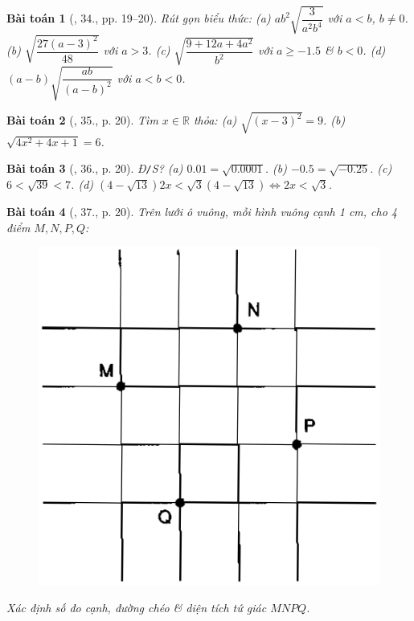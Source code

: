\documentclass{article}
\newtheorem{baitoan}{Bài toán}
\begin{document}
\begin{baitoan}[\cite{SGK_Toan_9_tap_1}, 34., pp. 19--20]
	Rút gọn biểu thức: (a) $ab^2\sqrt{\dfrac{3}{a^2b^4}}$ với $a < b$, $b\ne0$. (b) $\sqrt{\dfrac{27(a - 3)^2}{48}}$ với $a > 3$. (c) $\sqrt{\dfrac{9 + 12a + 4a^2}{b^2}}$ với $a\ge-1.5$ \& $b < 0$. (d) $(a - b)\sqrt{\dfrac{ab}{(a - b)^2}}$ với $a < b < 0$.
\end{baitoan}

\begin{baitoan}[\cite{SGK_Toan_9_tap_1}, 35., p. 20]
	Tìm $x\in\mathbb{R}$ thỏa: (a) $\sqrt{(x - 3)^2} = 9$. (b) $\sqrt{4x^2 + 4x + 1} = 6$.
\end{baitoan}

\begin{baitoan}[\cite{SGK_Toan_9_tap_1}, 36., p. 20]
	\emph{Đ\texttt{/}S?} (a) $0.01 = \sqrt{0.0001}$. (b) $-0.5 = \sqrt{-0.25}$. (c) $6 < \sqrt{39} < 7$. (d) $(4 - \sqrt{13})2x < \sqrt{3}(4 - \sqrt{13})\Leftrightarrow2x < \sqrt{3}$.
\end{baitoan}

\begin{baitoan}[\cite{SGK_Toan_9_tap_1}, 37., p. 20]
	Trên lưới ô vuông, mỗi hình vuông cạnh \emph{1 cm}, cho 4 điểm $M,N,P,Q$:
	\begin{figure}[H]
		\centering
		\includegraphics[scale=0.2]{SGK_3_p20}
	\end{figure}
	\noindent Xác định số đo cạnh, đường chéo \& diện tích tứ giác $MNPQ$.
\end{baitoan}
\end{document}
